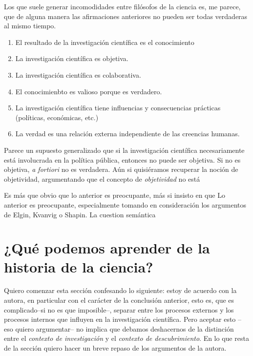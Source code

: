 Los que suele generar incomodidades entre filósofos de la ciencia es, me parece, que de alguna manera las afirmaciones anteriores no pueden ser todas verdaderas al mismo tiempo.

\begin{enumerate}
\item El resultado de la investigación científica es el conocimiento
\item La investigación científica es objetiva.
\item La investigación científica es colaborativa.
\item El conocimienbto es valioso porque es verdadero.
\item La investigación científica tiene influencias y consecuencias prácticas (políticas, económicas, etc.)
\item La verdad es una relación externa independiente de las creencias humanas.
\end{enumerate}

Parece un supuesto generalizado que si la investigación científica necesariamente está involucrada en la política pública, entonces no puede ser objetiva. Si no es objetiva, \textit{a fortiori} no es verdadera.  Aún si quisiéramos recuperar la noción de objetividad, argumentando que el concepto de \textit{objetividad} no está %

Es más que obvio que lo anterior es preocupante, más si insisto en que Lo anterior es preocupante, especialmente tomando en consideración los argumentos de Elgin, Kvanvig o Shapin. La cuestion semántica





\section{¿Qué podemos aprender de la historia de la ciencia?}

\noindent Quiero comenzar esta sección confesando lo siguiente: estoy de
acuerdo con la autora, en particular con el carácter de la conclusión
anterior, esto es, que es complicado--si no es que imposible--, separar
entre los procesos externos y los procesos internos que influyen en la
investigación científica. Pero aceptar esto --eso quiero argumentar-- no
implica que debamos deshacernos de la distinción entre el \emph{contexto de
investigación} y el \emph{contexto de descubrimiento}. En lo que resta de
la sección quiero hacer un breve repaso de los argumentos de la autora.


